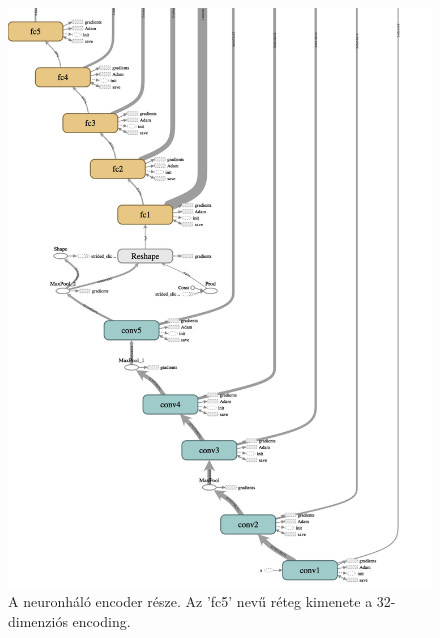 \begin{figure}[p]
    \includegraphics{src/images/tensorflow_graph_encode.png}
    \caption{A neuronháló encoder része. Az 'fc5' nevű réteg kimenete a 32-dimenziós encoding.}
\end{figure}

